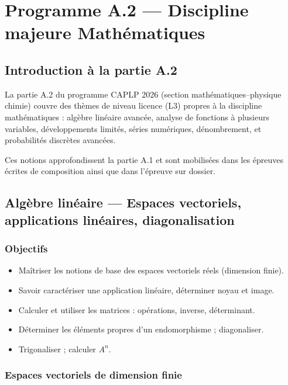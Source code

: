 \documentclass[11pt,a4paper,twoside]{book}
\begin{document}

\part{Programme A.2 — Discipline majeure Mathématiques}

\chapter*{Introduction à la partie A.2}

La partie A.2 du programme CAPLP 2026 (section mathématiques–physique chimie) couvre des
thèmes de niveau licence (L3) propres à la discipline mathématiques : algèbre linéaire avancée,
analyse de fonctions à plusieurs variables, développements limités, séries numériques,
dénombrement, et probabilités discrètes avancées.

Ces notions approfondissent la partie A.1 et sont mobilisées dans les épreuves écrites
de composition ainsi que dans l'épreuve sur dossier.

\chapter{Algèbre linéaire — Espaces vectoriels, applications linéaires, diagonalisation}

\section*{Objectifs}
\begin{itemize}[leftmargin=1.5em]
  \item Maîtriser les notions de base des espaces vectoriels réels (dimension finie).
  \item Savoir caractériser une application linéaire, déterminer noyau et image.
  \item Calculer et utiliser les matrices : opérations, inverse, déterminant.
  \item Déterminer les éléments propres d'un endomorphisme ; diagonaliser.
  \item Trigonaliser ; calculer $A^n$.
\end{itemize}

\section{Espaces vectoriels de dimension finie}
\end{document}
